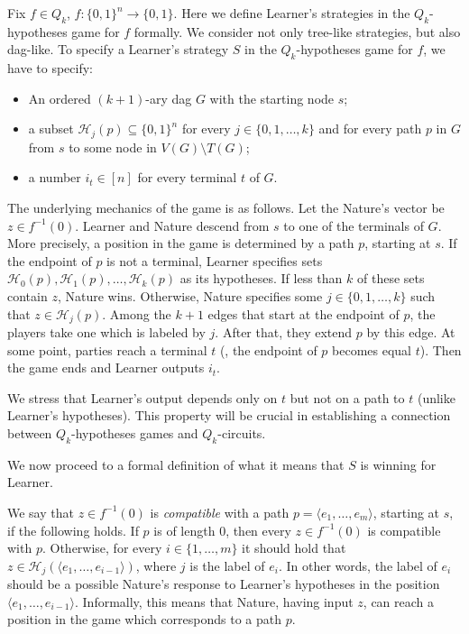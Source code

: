 Fix $f\in Q_k$, $f\colon\{0, 1\}^n\to\{0,1\}$. Here we define Learner's strategies in the $Q_k$-hypotheses game for $f$ formally. We consider not only tree-like strategies, but also dag-like. To specify a Learner's strategy $S$ in the $Q_k$-hypotheses game for $f$, we have to specify:
\begin{itemize}
\item An ordered $(k+1)$-ary dag $G$ with the starting node $s$;
\item a subset $\mathcal{H}_j(p)\subseteq\{0,1\}^n$ for every $j\in\{0, 1, \ldots, k\}$ and for every path $p$ in $G$ from $s$ to some node in $V(G)\setminus T(G)$;
\item a number $i_t\in [n]$ for every terminal $t$ of $G$.
\end{itemize}
The underlying mechanics of the game is as follows. Let the Nature's vector be $z\in f^{-1}(0)$. Learner and Nature descend from $s$ to one of the terminals of $G$. More precisely, a position in the game is determined by a path $p$, starting at $s$. If the endpoint of $p$ is not a terminal, Learner specifies sets $\mathcal{H}_0(p), \mathcal{H}_1(p), \ldots, \mathcal{H}_k(p)$ as its hypotheses.
%
If less than $k$ of these sets contain $z$, Nature wins. Otherwise, Nature specifies some $j\in\{0, 1, \ldots, k\}$ such that $z\in\mathcal{H}_j(p)$. Among the $k+1$ edges that start at the endpoint of $p$, the players take one which is labeled by $j$. After that, they extend $p$ by this edge. At some point, parties reach a terminal $t$ (\ie, the endpoint of $p$ becomes equal $t$). Then the game ends and Learner outputs $i_t$.

We stress that Learner's output depends only on $t$ but not on a path to $t$ (unlike Learner's hypotheses). This property will be crucial in establishing a connection between $Q_k$-hypotheses games and $Q_k$-circuits.

We now proceed to a formal definition of what it means that $S$ is winning for Learner.

We say that $z\in f^{-1}(0)$ is \emph{compatible} with a path $p = \langle e_1, \ldots, e_m\rangle$, starting at $s$, if the following holds. If $p$ is of length $0$, then every $z\in f^{-1}(0)$ is compatible with $p$. Otherwise, for every $i\in\{1, \ldots, m\}$ it should hold that $z\in\mathcal{H}_j(\langle e_1, \ldots, e_{i - 1}\rangle)$, where $j$ is the label of $e_i$. In other words, the label of $e_i$ should be a possible Nature's response to Learner's hypotheses in the position $\langle e_1, \ldots, e_{i - 1}\rangle$.
Informally, this means that Nature, having input $z$, can reach a position in the game which corresponds to a path $p$.

